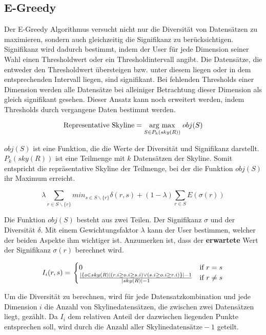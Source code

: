 \subsection{E-Greedy}
\label{ch:Analyse:sec:repSkyAlgos:subsec:eGreedy}
Der E-Greedy Algorithmus \cite{magnani2014taking} versucht nicht nur die Diversität von Datensätzen zu maximieren, sondern auch gleichzeitig die Signifikanz zu berücksichtigen.
Signifikanz wird dadurch bestimmt, indem der User für jede Dimension seiner Wahl einen Thresholdwert oder ein Thresholdintervall angibt. Die Datensätze, die entweder den Thresholdwert übersteigen bzw. unter diesem liegen oder in dem entsprechenden Intervall liegen, sind signifikant. Bei fehlenden Thresholds einer Dimension werden alle Datensätze bei alleiniger Betrachtung dieser Dimension als gleich signifikant gesehen. Dieser Ansatz kann noch erweitert werden, indem Thresholds durch vergangene Daten bestimmt werden. 

$$\text{Representative Skyline} = \underset{S \in{P_k(sky(R))}}{\operatorname{arg}\,\operatorname{max}}\; obj(S)$$

$obj(S)$ ist eine Funktion, die die Werte der Diversität und Signifikanz darstellt. $P_k(sky(R))$ ist eine Teilmenge mit $k$ Datensätzen der Skyline. Somit entspricht die repräsentative Skyline der Teilmenge, bei der die Funktion $obj(S)$ ihr Maximum erreicht.

$$\lambda \sum\limits_{r \in{S \backslash \{r\}}} min_{s \in S \backslash \{r\}}\delta(r,s)+(1- \lambda) \sum\limits_{r \in{S}}E(\sigma(r))$$

Die Funktion $obj(S)$ besteht aus zwei Teilen. Der Signifikanz $\sigma$ und der Diversität $\delta$.
Mit einem Gewichtungsfaktor $\lambda$ kann der User bestimmen, welcher der beiden Aspekte ihm wichtiger ist. Anzumerken ist, dass der \textbf{erwartete} Wert der Signifikanz $\sigma(r)$ berechnet wird. 

$$\begin{displaystyle}
  I_i(r, s) = \left.
  \begin{cases}
    0 & \text{if } r=s \\
    \frac{|\{o \in{sky(R)}| (r.i \geq o.i \geq s.i) \lor (s.i \geq o.i \geq r.i)\}|-1}{|sky(R)|-1} & \text{if } r \neq s
  \end{cases}
  \right.
\end{displaystyle}$$

Um die Diversität zu berechnen, wird für jede Datensatzkombination und jede Dimension $i$ die Anzahl von Skylinedatensätzen, die zwischen zwei Datensätzen liegt, gezählt. Da $I_i$ dem relativen Anteil der dazwischen liegenden Punkte entsprechen soll, wird durch die $\text{Anzahl aller Skylinedatensätze}-1$ geteilt.

